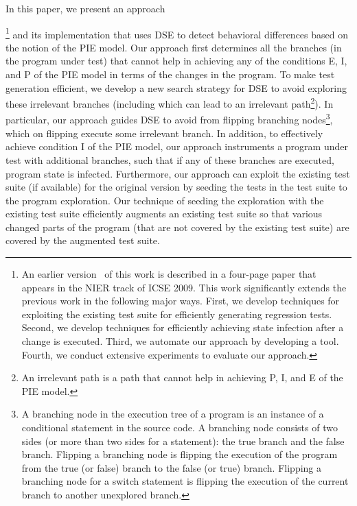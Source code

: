 In this paper, we present an approach{\footnote{\scriptsize{An earlier version~\cite{taneja09:guided} of this work is described in a four-page paper that appears in the NIER track of ICSE 2009. This
work significantly extends the previous work in the following major ways.
First, we develop techniques for exploiting the existing test suite for efficiently generating regression tests.
Second, we develop techniques for efficiently achieving state infection after a change is executed.
Third, we automate our approach by developing a tool.
Fourth, we conduct extensive experiments to evaluate our approach.}}  and its implementation that uses DSE to detect behavioral differences based on the notion of the PIE model.
Our approach first determines all the branches (in the program under test) that cannot help in achieving any of the conditions E, I, and P of the PIE model in terms of the changes in the program. To make test generation efficient, we develop a new search strategy for DSE to avoid exploring these irrelevant branches (including which can lead to an irrelevant path\footnote{\scriptsize{An irrelevant path is a path that cannot help in achieving P, I, and E of the PIE model.}}). In particular, our approach guides DSE to avoid from flipping branching nodes\footnote{\scriptsize{A branching node in the execution tree of a program is an instance of a conditional statement in the source code. A branching node consists of two sides (or more than two sides for a  statement): the true branch and the false branch. Flipping a branching node is flipping the execution of the program from the true (or false) branch to the false (or true) branch. Flipping a branching node for a switch statement is flipping the execution of the current branch to another unexplored branch.}}, which on flipping execute some irrelevant branch. 
In addition, to effectively achieve condition I of the PIE model, our approach instruments a program under test with additional branches, 
such that if any of these branches are executed, program state is infected. 
Furthermore, our approach can exploit the existing test suite (if available) for the original version by seeding the tests in the test suite to the program exploration. Our technique of seeding the exploration with the existing test suite efficiently augments an existing test suite so that various changed parts of the program (that are not covered by the existing test suite) are covered by the augmented test suite. 

}
